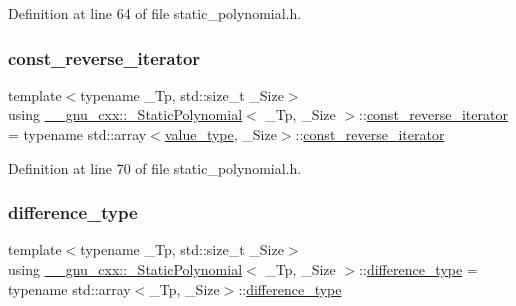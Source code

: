 Definition at line 64 of file static\+\_\+polynomial.\+h.

\mbox{\label{class____gnu__cxx_1_1__StaticPolynomial_ae59b7bc5bdf7c61e562e8c4c8eaf904d}} 
\subsubsection{\texorpdfstring{const\+\_\+reverse\+\_\+iterator}{const\_reverse\_iterator}}
{\footnotesize\ttfamily template$<$typename \+\_\+\+Tp, std\+::size\+\_\+t \+\_\+\+Size$>$ \\
using \hyperlink{class____gnu__cxx_1_1__StaticPolynomial}{\+\_\+\+\_\+gnu\+\_\+cxx\+::\+\_\+\+Static\+Polynomial}$<$ \+\_\+\+Tp, \+\_\+\+Size $>$\+::\hyperlink{class____gnu__cxx_1_1__StaticPolynomial_ae59b7bc5bdf7c61e562e8c4c8eaf904d}{const\+\_\+reverse\+\_\+iterator} =  typename std\+::array$<$\hyperlink{class____gnu__cxx_1_1__StaticPolynomial_aad5f3d6d5876b6926b30724aeac649d6}{value\+\_\+type}, \+\_\+\+Size$>$\+::\hyperlink{class____gnu__cxx_1_1__StaticPolynomial_ae59b7bc5bdf7c61e562e8c4c8eaf904d}{const\+\_\+reverse\+\_\+iterator}}



Definition at line 70 of file static\+\_\+polynomial.\+h.

\mbox{\label{class____gnu__cxx_1_1__StaticPolynomial_a5a19bcdbc252f457c64ac035d33e824a}} 
\subsubsection{\texorpdfstring{difference\+\_\+type}{difference\_type}}
{\footnotesize\ttfamily template$<$typename \+\_\+\+Tp, std\+::size\+\_\+t \+\_\+\+Size$>$ \\
using \hyperlink{class____gnu__cxx_1_1__StaticPolynomial}{\+\_\+\+\_\+gnu\+\_\+cxx\+::\+\_\+\+Static\+Polynomial}$<$ \+\_\+\+Tp, \+\_\+\+Size $>$\+::\hyperlink{class____gnu__cxx_1_1__StaticPolynomial_a5a19bcdbc252f457c64ac035d33e824a}{difference\+\_\+type} =  typename std\+::array$<$\+\_\+\+Tp, \+\_\+\+Size$>$\+::\hyperlink{class____gnu__cxx_1_1__StaticPolynomial_a5a19bcdbc252f457c64ac035d33e824a}{difference\+\_\+type}}



